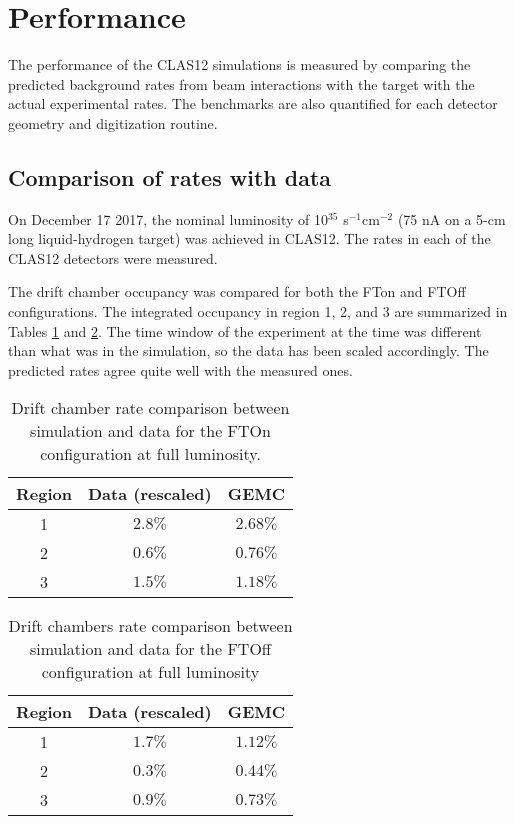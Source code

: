 \section{Performance}

The performance of the CLAS12 simulations is measured by comparing the predicted background rates from beam interactions
with the target with the actual experimental rates. The benchmarks are also quantified for each detector geometry and digitization routine.

\subsection{Comparison of rates with data}
On December 17 2017, the nominal luminosity of 10$^{35}$ s$^{-1}$cm$^{-2}$
(75 nA on a 5-cm long liquid-hydrogen target) was achieved in CLAS12.
The rates in each of the CLAS12 detectors were measured.

The drift chamber occupancy was compared for both the FTon and FTOff configurations. The integrated occupancy
in region 1, 2, and 3 are summarized in Tables \ref{tab:ftOnComparison} and \ref{tab:ftOffComparison}. The
time window of the experiment at the time was different than what was in the simulation, so the data has been scaled
accordingly. The predicted rates agree quite well with the measured ones.

\begin{table}[h]
	\begin{center}
		\begin{tabular}{| c | c | c |}
			Region & Data (rescaled) &  GEMC \\
			\hline
			1 &  $2.8\%$  & $2.68\%$ \\
			2 &  $0.6\%$  & $0.76\%$ \\
			3 &  $1.5\%$  & $1.18\%$ \\
		\end{tabular}
	\end{center}
	\caption{Drift chamber rate comparison between simulation and data for the FTOn configuration at full luminosity.}\label{tab:ftOnComparison}
\end{table}

\begin{table}[h]
	\begin{center}
		\begin{tabular}{| c | c | c |}
			Region & Data (rescaled) &  GEMC \\
			\hline
			1 &  $1.7\%$  & $1.12\%$ \\
			2 &  $0.3\%$  & $0.44\%$ \\
			3 &  $0.9\%$  & $0.73\%$ \\
		\end{tabular}
	\end{center}
	\caption{Drift chambers rate comparison between simulation and data for the FTOff configuration at full luminosity}\label{tab:ftOffComparison}
\end{table}


